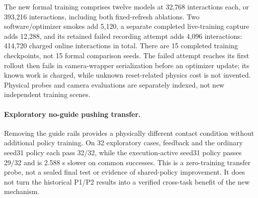 The new formal training comprises twelve models at 32,768 interactions each, or 393,216 interactions, including both fixed-refresh ablations. Two software/optimizer smokes add 5,120, a separate completed live-training capture adds 12,288, and its retained failed recording attempt adds 4,096 interactions: 414,720 charged online interactions in total. There are 15 completed training checkpoints, not 15 formal comparison seeds. The failed attempt reaches its first rollout then fails in camera-wrapper serialization before an optimizer update; its known work is charged, while unknown reset-related physics cost is not invented. Physical probes and camera evaluations are separately indexed, not new independent training scenes.



\paragraph{Exploratory no-guide pushing transfer.}
Removing the guide rails provides a physically different contact condition without additional policy training. On 32 exploratory cases, feedback and the ordinary seed31 policy each pass 32/32, while the execution-active seed31 policy passes 29/32 and is 2.588 s slower on common successes. This is a zero-training transfer probe, not a sealed final test or evidence of shared-policy improvement. It does not turn the historical P1/P2 results into a verified cross-task benefit of the new mechanism.

